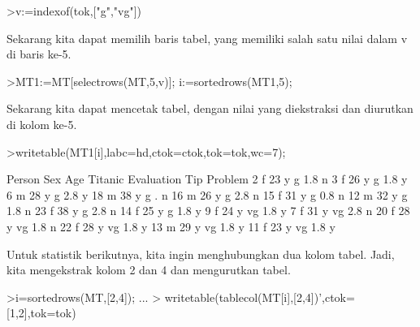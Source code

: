 \documentclass[a4paper,10pt]{article}
\begin{document}
\begin{eulernotebook}
\begin{eulerprompt}
>v:=indexof(tok,["g","vg"])
\end{eulerprompt}
\begin{euleroutput}
  [5,  6]
\end{euleroutput}
\begin{eulercomment}
Sekarang kita dapat memilih baris tabel, yang memiliki salah satu
nilai dalam v di baris ke-5.
\end{eulercomment}
\begin{eulerprompt}
>MT1:=MT[selectrows(MT,5,v)]; i:=sortedrows(MT1,5);
\end{eulerprompt}
\begin{eulercomment}
Sekarang kita dapat mencetak tabel, dengan nilai yang diekstraksi dan
diurutkan di kolom ke-5.
\end{eulercomment}
\begin{eulerprompt}
>writetable(MT1[i],labc=hd,ctok=ctok,tok=tok,wc=7);
\end{eulerprompt}
\begin{euleroutput}
   Person    Sex    Age Titanic Evaluation    Tip Problem
        2      f     23       y          g    1.8       n
        3      f     26       y          g    1.8       y
        6      m     28       y          g    2.8       y
       18      m     38       y          g      .       n
       16      m     26       y          g    2.8       n
       15      f     31       y          g    0.8       n
       12      m     32       y          g    1.8       n
       23      f     38       y          g    2.8       n
       14      f     25       y          g    1.8       y
        9      f     24       y         vg    1.8       y
        7      f     31       y         vg    2.8       n
       20      f     28       y         vg    1.8       n
       22      f     28       y         vg    1.8       y
       13      m     29       y         vg    1.8       y
       11      f     23       y         vg    1.8       y
\end{euleroutput}
\begin{eulercomment}
Untuk statistik berikutnya, kita ingin menghubungkan dua kolom tabel.
Jadi, kita mengekstrak kolom 2 dan 4 dan mengurutkan tabel.
\end{eulercomment}
\begin{eulerprompt}
>i=sortedrows(MT,[2,4]);  ...
>  writetable(tablecol(MT[i],[2,4])',ctok=[1,2],tok=tok)
\end{eulerprompt}
\begin{euleroutput}

\end{euleroutput}
\end{eulernotebook}
\end{document}
